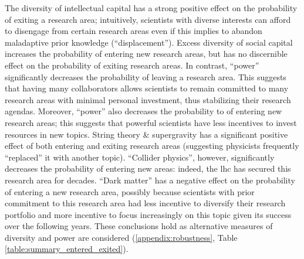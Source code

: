 \documentclass{article}
\begin{document}
The diversity of intellectual capital has a strong positive effect on the probability of exiting a research area; intuitively, scientists with diverse interests can afford to disengage from certain research areas even if this implies to abandon maladaptive prior knowledge (``displacement''). Excess diversity of social capital increases the probability of entering new research areas, but has no discernible effect on the probability of exiting research areas. In contrast, ``power'' significantly decreases the probability of leaving a research area. This suggests that having many collaborators allows scientists to remain committed to many research areas with minimal personal investment, thus stabilizing their research agendas. Moreover, ``power'' also decreases the probability to of entering new research areas; this suggests that powerful scientists have less incentives to invest resources in new topics. String theory \& supergravity has a significant positive effect of both entering and exiting research areas (suggesting physicists frequently ``replaced'' it with another topic). ``Collider physics'', however, significantly decreases the probability of entering new areas: indeed, the \gls{lhc} has secured this research area for decades. %
``Dark matter'' has a negative effect on the probability of entering a new research area, possibly because scientists with prior commitment to this research area had less incentive to diversify their research portfolio and more incentive to focus increasingly on this topic given its success over the following years. These conclusions hold as alternative measures of diversity and power are considered (\ref{appendix:robustness}, Table \ref{table:summary_entered_exited}).
 
\end{document}
